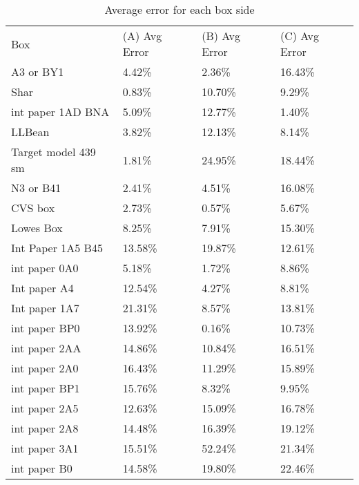 \documentclass[11pt, twoside, reqno]{book}
\begin{document}
\begin{table}[]
	\centering

	\label{AR2C}
	\begin{tabular}{llll}
		Box                 & (A) Avg Error & (B) Avg Error & (C) Avg Error \\
		A3 or BY1           & 4.42\%        & 2.36\%        & 16.43\%       \\
		Shar                & 0.83\%        & 10.70\%       & 9.29\%        \\
		int paper 1AD BNA   & 5.09\%        & 12.77\%       & 1.40\%        \\
		LLBean              & 3.82\%        & 12.13\%       & 8.14\%        \\
		Target model 439 sm & 1.81\%        & 24.95\%       & 18.44\%       \\
		N3 or B41           & 2.41\%        & 4.51\%        & 16.08\%       \\
		CVS box             & 2.73\%        & 0.57\%        & 5.67\%        \\
		Lowes Box           & 8.25\%        & 7.91\%        & 15.30\%       \\
		Int Paper 1A5 B45   & 13.58\%       & 19.87\%       & 12.61\%       \\
		int paper 0A0       & 5.18\%        & 1.72\%        & 8.86\%        \\
		Int paper A4        & 12.54\%       & 4.27\%        & 8.81\%        \\
		Int paper 1A7       & 21.31\%       & 8.57\%        & 13.81\%       \\
		int paper BP0       & 13.92\%       & 0.16\%        & 10.73\%       \\
		int paper 2AA       & 14.86\%       & 10.84\%       & 16.51\%       \\
		int paper 2A0       & 16.43\%       & 11.29\%       & 15.89\%       \\
		int paper BP1       & 15.76\%       & 8.32\%        & 9.95\%        \\
		int paper 2A5       & 12.63\%       & 15.09\%       & 16.78\%       \\
		int paper 2A8       & 14.48\%       & 16.39\%       & 19.12\%       \\
		int paper 3A1       & 15.51\%       & 52.24\%       & 21.34\%       \\
		int paper B0        & 14.58\%       & 19.80\%       & 22.46\%      
	\end{tabular}
\caption{Average error for each box side}
\end{table}
\end{document}
